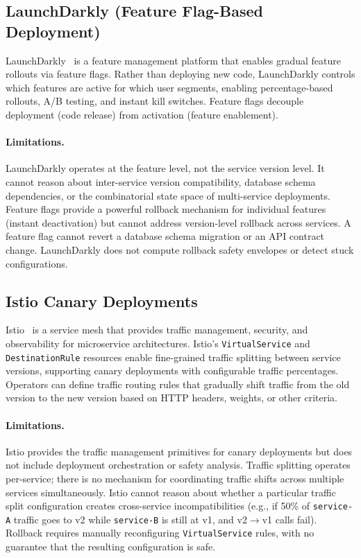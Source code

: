 \documentclass[10pt,twocolumn]{article}
\begin{document}
\subsection{LaunchDarkly (Feature Flag-Based Deployment)}

LaunchDarkly~\cite{launchdarkly} is a feature management
platform that enables gradual feature rollouts via feature
flags. Rather than deploying new code, LaunchDarkly controls
which features are active for which user segments, enabling
percentage-based rollouts, A/B testing, and instant kill
switches. Feature flags decouple deployment (code release)
from activation (feature enablement).

\paragraph{Limitations.}
LaunchDarkly operates at the feature level, not the service
version level. It cannot reason about inter-service version
compatibility, database schema dependencies, or the
combinatorial state space of multi-service deployments.
Feature flags provide a powerful rollback mechanism for
individual features (instant deactivation) but cannot
address version-level rollback across services. A feature
flag cannot revert a database schema migration or an API
contract change. LaunchDarkly does not compute rollback
safety envelopes or detect stuck configurations.

\subsection{Istio Canary Deployments}

Istio~\cite{istio} is a service mesh that provides traffic
management, security, and observability for microservice
architectures. Istio's \texttt{VirtualService} and
\texttt{DestinationRule} resources enable fine-grained
traffic splitting between service versions, supporting
canary deployments with configurable traffic percentages.
Operators can define traffic routing rules that gradually
shift traffic from the old version to the new version based
on HTTP headers, weights, or other criteria.

\paragraph{Limitations.}
Istio provides the traffic management primitives for canary
deployments but does not include deployment orchestration or
safety analysis. Traffic splitting operates per-service;
there is no mechanism for coordinating traffic shifts across
multiple services simultaneously. Istio cannot reason about
whether a particular traffic split configuration creates
cross-service incompatibilities (e.g., if 50\% of
\texttt{service-A} traffic goes to v2 while
\texttt{service-B} is still at v1, and v2$\to$v1 calls
fail). Rollback requires manually reconfiguring
\texttt{VirtualService} rules, with no guarantee that the
resulting configuration is safe.
\end{document}
